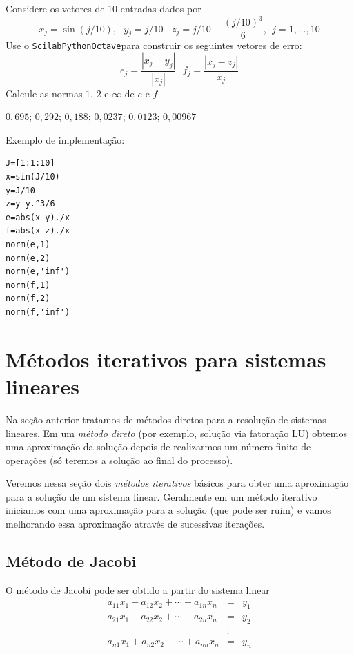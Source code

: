 \begin{exer} Considere os vetores de 10 entradas dados por $$x_j=\sin(j/10),~~~y_j=j/10~~~~z_j=j/10-\frac{\left(j/10\right)^3}{6},~~ j=1,\ldots,10$$
Use o \ifisscilab\verb+Scilab+\fi\ifispython\verb+Python+\fi\ifisoctave\verb+Octave+\fi para construir os seguintes vetores de erro:
$$e_{j}=\frac{|x_j-y_j|}{|x_j|}~~~ f_j=\frac{|x_j-z_j|}{x_j}$$
Calcule as normas $1$, $2$ e $\infty$ de $e$ e $f$
\end{exer}
\begin{resp}
$0,695$; $0,292$; $0,188$;  $0,0237$; $0,0123$; $0,00967$

\ifisscilab
Exemplo de implementação:
\begin{verbatim}
J=[1:1:10]
x=sin(J/10)
y=J/10
z=y-y.^3/6
e=abs(x-y)./x
f=abs(x-z)./x
norm(e,1)
norm(e,2)
norm(e,'inf')
norm(f,1)
norm(f,2)
norm(f,'inf')
\end{verbatim}
\fi    
\end{resp}



\section{Métodos iterativos para sistemas lineares}
Na seção anterior tratamos de métodos diretos para a resolução de sistemas lineares. Em um \emph{método direto} (por exemplo, solução via fatoração LU) obtemos uma aproximação da solução depois de realizarmos um número finito de operações (só teremos a solução ao final do processo).

Veremos nessa seção dois \emph{métodos iterativos} básicos para obter uma aproximação para a solução de um sistema linear. Geralmente em um método iterativo iniciamos com uma aproximação para a solução (que pode ser ruim) e vamos melhorando essa aproximação através de sucessivas iterações.

\subsection{Método de Jacobi}
O método de Jacobi pode ser obtido a partir do sistema linear
\begin{eqnarray*}
a_{11}x_1+a_{12}x_2+\cdots+a_{1n}x_n&=&y_1\\
a_{21}x_1+a_{22}x_2+\cdots+a_{2n}x_n&=&y_2\\
&\vdots&     \\
a_{n1}x_1+a_{n2}x_2+\cdots+a_{nn}x_n&=& y_n
\end{eqnarray*}

